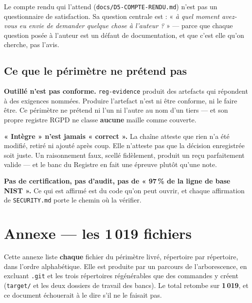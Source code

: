 \documentclass[10pt]{report}
\newcommand{\code}[1]{\texttt{\small #1}}
\begin{document}
Le compte rendu qui l'attend (\code{docs/D5-COMPTE-RENDU.md}) n'est pas un questionnaire de
satisfaction. Sa question centrale est : « \emph{à quel moment avez-vous eu envie de demander quelque
chose à l'auteur ?} » --- parce que chaque question posée à l'auteur est un défaut de documentation,
et que c'est elle qu'on cherche, pas l'avis.

\section{Ce que le périmètre ne prétend pas}

\begin{alerte}
\textbf{Outillé n'est pas conforme.} \code{reg-evidence} produit des artefacts qui répondent à des
exigences nommées. Produire l'artefact n'est ni être conforme, ni le faire être. Ce périmètre ne
prétend ni l'un ni l'autre au nom d'un tiers --- et son propre registre RGPD ne classe
\textbf{aucune} maille comme couverte.

\medskip
\textbf{« Intègre » n'est jamais « correct ».} La chaîne atteste que rien n'a été modifié, retiré ni
ajouté après coup. Elle n'atteste pas que la décision enregistrée soit juste. Un raisonnement faux,
scellé fidèlement, produit un reçu parfaitement valide --- et le banc du Registre en fait une épreuve
plutôt qu'une note.

\medskip
\textbf{Pas de certification, pas d'audit, pas de « 97\,\% de la ligne de base NIST ».} Ce qui est
affirmé est du code qu'on peut ouvrir, et chaque affirmation de \code{SECURITY.md} porte le chemin
où la vérifier.
\end{alerte}


\appendix
\chapter{Annexe --- les 1\,019 fichiers}

Cette annexe liste \textbf{chaque} fichier du périmètre livré, répertoire par répertoire, dans
l'ordre alphabétique. Elle est produite par un parcours de l'arborescence, en excluant \code{.git}
et les trois répertoires régénérables que des commandes y créent (\code{target/} et les deux
dossiers de travail des bancs). Le total retombe sur \textbf{1\,019}, et ce document échouerait à
le dire s'il ne le faisait pas.
\end{document}
